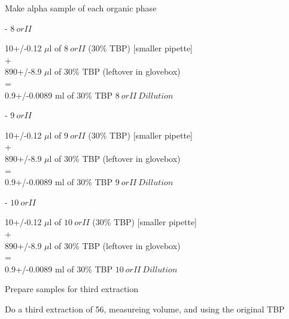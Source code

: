 \documentclass[idxtotoc,hyperref,openany,oneside]{labbook} %
\begin{document}
\begin{todolist}
\item{Make alpha sample of each organic phase}
\begin{todolist}
\item{- $\boxed{8\ orII}$}
\end{todolist}
\begin{center}
10+/-0.12 $\mu$l of $\boxed{8\ orII}$ (30\% TBP) [smaller pipette]\\
+\\
890+/-8.9 $\mu$l of 30\% TBP (leftover in glovebox)\\
=\\
0.9+/-0.0089 ml of 30\% TBP $\boxed{8\ orII\ Dillution}$
\end{center}

\begin{todolist}
\item{- $\boxed{9\ orII}$}
\end{todolist}
\begin{center}
10+/-0.12 $\mu$l of $\boxed{9\ orII}$ (30\% TBP) [smaller pipette]\\
+\\
890+/-8.9 $\mu$l of 30\% TBP (leftover in glovebox)\\
=\\
0.9+/-0.0089 ml of 30\% TBP $\boxed{9\ orII\ Dillution}$
\end{center}

\begin{todolist}
\item{- $\boxed{10\ orII}$}
\end{todolist}
\begin{center}
10+/-0.12 $\mu$l of $\boxed{10\ orII}$ (30\% TBP) [smaller pipette]\\
+\\
890+/-8.9 $\mu$l of 30\% TBP (leftover in glovebox)\\
=\\
0.9+/-0.0089 ml of 30\% TBP $\boxed{10\ orII\ Dillution}$
\end{center}


\end{todolist}  



\begin{todolist}
\item{Prepare samples for third extraction}
\end{todolist}


\begin{todolist}
\item{Do a third extraction of 56, measureing volume,
  and using the original TBP}
\end{todolist}
\end{document}
